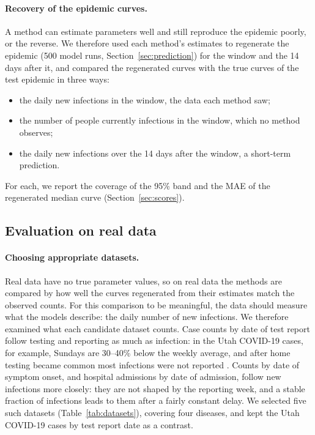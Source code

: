 \documentclass[12pt]{article}
\begin{document}
\paragraph{Recovery of the epidemic curves.} A method can estimate parameters well and still reproduce
the epidemic poorly, or the reverse. We therefore used each method's estimates to regenerate the epidemic
(500 model runs, Section~\ref{sec:prediction}) for the window and the 14 days after it, and compared the
regenerated curves with the true curves of the test epidemic in three ways:
\begin{itemize}[leftmargin=*]
\item the daily new infections in the window, the data each method saw;
\item the number of people currently infectious in the window, which no method observes;
\item the daily new infections over the 14 days after the window, a short-term prediction.
\end{itemize}
For each, we report the coverage of the 95\% band and the MAE of the regenerated median curve
(Section~\ref{sec:scores}).

\subsection{Evaluation on real data}\label{sec:eval-real}

\paragraph{Choosing appropriate datasets.} Real data have no true parameter values, so on real data the
methods are compared by how well the curves regenerated from their estimates match the observed counts.
For this comparison to be meaningful, the data should measure what the models describe: the daily
number of new infections. We therefore examined what each candidate dataset counts. Case counts by date
of test report follow testing and reporting as much as infection: in the Utah COVID-19 cases, for
example, Sundays are 30--40\% below the weekly average, and after home testing became common most
infections were not reported \autocite{utahdhhs2025covid}. Counts by date of symptom onset, and hospital
admissions by date of admission, follow new infections more closely: they are not shaped by the
reporting week, and a stable fraction of infections leads to them after a fairly constant delay. We
selected five such datasets (Table~\ref{tab:datasets}), covering four diseases, and kept the Utah
COVID-19 cases by test report date as a contrast.
\end{document}
